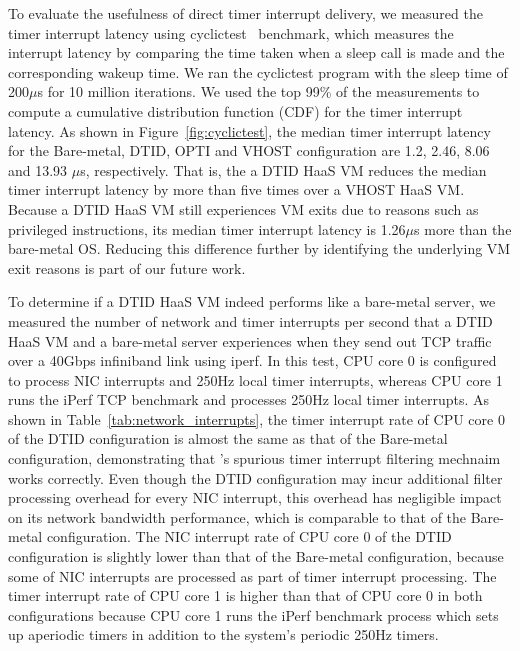 To evaluate the usefulness of direct timer interrupt delivery, we 
measured the timer interrupt latency using cyclictest~\cite{cyclictest} benchmark, which 
measures the interrupt latency by comparing the time taken when a sleep 
call is made and the corresponding wakeup time. 
We ran the cyclictest program with the sleep time of 200$\mu$s for 10 million
iterations. 
We used the top 99\% of the measurements to compute a cumulative distribution function (CDF)
for the timer interrupt latency. As shown in Figure~\ref{fig:cyclictest}, the 
median timer interrupt latency for the Bare-metal, DTID, OPTI and
VHOST configuration are 1.2, 2.46, 8.06 and 13.93 $\mu$s, respectively.
That is, the a DTID HaaS VM reduces the median timer interrupt latency by
more than five times over a VHOST HaaS VM.
Because a DTID HaaS VM still experiences VM exits due to reasons such as privileged instructions,
its median timer interrupt latency is 1.26$\mu$s more than the bare-metal OS. 
Reducing this difference further by identifying the underlying VM exit reasons 
is part of our future work.


To determine if a DTID HaaS VM indeed performs like a bare-metal server,
we measured the number of network and timer interrupts per second that a DTID HaaS VM and a bare-metal server
experiences when they send out TCP traffic over a 40Gbps infiniband link using iperf.
In this test, CPU core 0 is configured to process NIC interrupts and 250Hz local timer interrupts, whereas CPU core 1 runs the 
iPerf TCP benchmark and processes 250Hz local timer interrupts.
As shown in Table~\ref{tab:network_interrupts},
the timer interrupt rate of CPU core 0 of the DTID configuration is almost the same as that of the Bare-metal configuration, 
demonstrating that \sna's spurious timer interrupt filtering mechnaim works correctly. 
Even though the DTID configuration may incur additional filter processing overhead for every NIC interrupt,
this overhead has negligible impact on its network bandwidth performance, which is comparable to that of the Bare-metal 
configuration.   
The NIC interrupt rate of CPU core 0 of the DTID configuration is slightly lower than that of the Bare-metal configuration, 
because some of NIC interrupts are processed as part of timer interrupt processing.
The timer interrupt rate of CPU core 1 is higher than that of CPU core 0 in both configurations because CPU core 1 runs
the iPerf benchmark process which sets up aperiodic timers in addition to the system's periodic 250Hz timers. 





